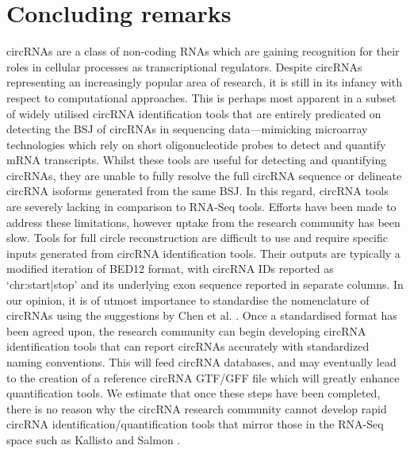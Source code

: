 \documentclass[journal,review,submit,pdftex,moreauthors]{Definitions/mdpi}
\begin{document}
\section{Concluding remarks}
circRNAs are a class of non-coding RNAs which are gaining recognition for their roles in cellular processes as transcriptional regulators. Despite circRNAs representing an increasingly popular area of research, it is still in its infancy with respect to computational approaches. This is perhaps most apparent in a subset of widely utilised circRNA identification tools that are entirely predicated on detecting the BSJ of circRNAs in sequencing data---mimicking microarray technologies which rely on short oligonucleotide probes to detect and quantify mRNA transcripts. Whilst these tools are useful for detecting and quantifying circRNAs, they are unable to fully resolve the full circRNA sequence or delineate circRNA isoforms generated from the same BSJ. In this regard, circRNA tools are severely lacking in comparison to RNA-Seq tools. Efforts have been made to address these limitations, however uptake from the research community has been slow. Tools for full circle reconstruction are difficult to use and require specific inputs generated from circRNA identification tools. Their outputs are typically a modified iteration of BED12 format, with circRNA IDs reported as `chr:start|stop' and its underlying exon sequence reported in separate columns. In our opinion, it is of utmost importance to standardise the nomenclature of circRNAs using the suggestions by Chen et al. \cite{Chen2023Jan}. Once a standardised format has been agreed upon, the research community can begin developing circRNA identification tools that can report circRNAs accurately with standardized naming conventions. This will feed circRNA databases, and may eventually lead to the creation of a reference circRNA GTF/GFF file which will greatly enhance quantification tools. We estimate that once these steps have been completed, there is no reason why the circRNA research community cannot develop rapid circRNA identification/quantification tools that mirror those in the RNA-Seq space such as Kallisto \cite{kallisto} and Salmon \cite{salmon}. \par




\end{document}
